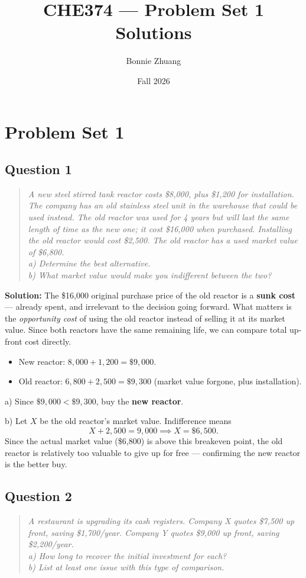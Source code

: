 \documentclass[11pt,letterpaper]{article}
\title{CHE374 --- Problem Set 1 Solutions}
\author{Bonnie Zhuang}
\date{Fall 2026}
\begin{document}
\maketitle

\section{Problem Set 1}

\subsection{Question 1}
\begin{quote}
    \itshape
    A new steel stirred tank reactor costs \$8,000, plus \$1,200 for
    installation. The company has an old stainless steel unit in the
    warehouse that could be used instead. The old reactor was used for
    4 years but will last the same length of time as the new one; it
    cost \$16,000 when purchased. Installing the old reactor would cost
    \$2,500. The old reactor has a used market value of \$6,800.
    \\ a) Determine the best alternative.
    \\ b) What market value would make you indifferent between the two?
\end{quote}

\textbf{Solution:} The \$16,000 original purchase price of the old
reactor is a \textbf{sunk cost} --- already spent, and irrelevant to
the decision going forward. What matters is the \emph{opportunity
cost} of using the old reactor instead of selling it at its market
value. Since both reactors have the same remaining life, we can
compare total up-front cost directly.
\begin{itemize}
    \item New reactor: $8{,}000 + 1{,}200 = \$9{,}000$.
    \item Old reactor: $6{,}800 + 2{,}500 = \$9{,}300$ (market value
    forgone, plus installation).
\end{itemize}
a) Since $\$9{,}000 < \$9{,}300$, buy the \textbf{new reactor}.

b) Let $X$ be the old reactor's market value. Indifference means
\[X + 2{,}500 = 9{,}000 \implies X = \$6{,}500.\]
Since the actual market value (\$6,800) is above this breakeven point,
the old reactor is relatively too valuable to give up for free ---
confirming the new reactor is the better buy.

\subsection{Question 2}
\begin{quote}
    \itshape
    A restaurant is upgrading its cash registers. Company X quotes
    \$7{,}500 up front, saving \$1{,}700/year. Company Y quotes
    \$9{,}000 up front, saving \$2{,}200/year.
    \\ a) How long to recover the initial investment for each?
    \\ b) List at least one issue with this type of comparison.
\end{quote}
\end{document}
